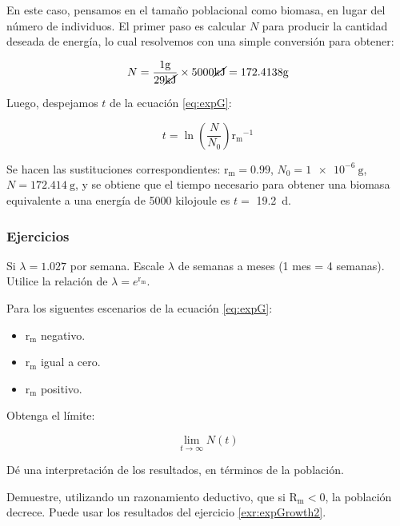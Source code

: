 \documentclass[12pt,letterpaper,]{book}
\let\BeginKnitrBlock\begin \let\EndKnitrBlock\end
\begin{document}
En este caso, pensamos en el tamaño poblacional como biomasa, en lugar
del número de individuos. El primer paso es calcular \(N\) para producir
la cantidad deseada de energía, lo cual resolvemos con una simple
conversión para obtener:

\[
N=\frac{1\si{\gram}}{29\cancel{\si{\kilo\joule}}}\times 5000 \cancel{\si{\kilo\joule}}=172.4138\si{\gram}
\]

Luego, despejamos \(t\) de la ecuación \eqref{eq:expG}:

\[
t = \ln \left(\frac{N}{N_0}\right)\mathrm{r_m}^{-1}
\]

Se hacen las sustituciones correspondientes: \(\mathrm{r_m} = 0.99\),
\(N_0 = \SI{1e-6}{\gram}\), \(N = \SI{172.414}{\gram}\), y se obtiene
que el tiempo necesario para obtener una biomasa equivalente a una
energía de 5000 kilojoule es \(t =\) \SI{ 19.2 }{\day}.

\subsubsection{Ejercicios}\label{ejercicios-1}

\BeginKnitrBlock{exercise}
\protect\hypertarget{exr:expGrowth1}{}{\label{exr:expGrowth1} }Si
\(\lambda = 1.027\) por semana. Escale \(\lambda\) de semanas a meses (1
mes = 4 semanas). Utilice la relación de \(\lambda = e^{\mathrm{r_m}}\).
\EndKnitrBlock{exercise}

\BeginKnitrBlock{exercise}
\protect\hypertarget{exr:expGrowth2}{}{\label{exr:expGrowth2} }Para los
siguentes escenarios de la ecuación \eqref{eq:expG}:

\begin{itemize}
\item
  \(\mathrm{r_m}\) negativo.
\item
  \(\mathrm{r_m}\) igual a cero.
\item
  \(\mathrm{r_m}\) positivo.
\end{itemize}

Obtenga el límite:

\[
  \lim_{t \to \infty } N(t)
\]

Dé una interpretación de los resultados, en términos de la población.
\EndKnitrBlock{exercise}

\BeginKnitrBlock{exercise}
\protect\hypertarget{exr:expGrowth3}{}{\label{exr:expGrowth3} }Demuestre,
utilizando un razonamiento deductivo, que si \(\mathrm{R_m} < 0\), la
población decrece. Puede usar los resultados del ejercicio
\ref{exr:expGrowth2}.
\EndKnitrBlock{exercise}
\end{document}
